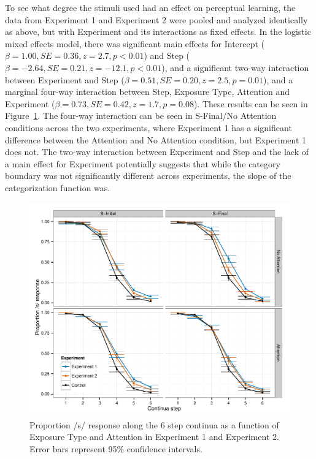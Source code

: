 \documentclass[11pt]{article}\usepackage[]{graphicx}\usepackage[]{color}
\begin{document}
To see what degree the stimuli used had an effect on perceptual learning, the data from Experiment 1 and Experiment 2 were pooled and analyzed identically as above, but with Experiment and its interactions as fixed effects.  In the logistic mixed effects model, there was significant main effects for Intercept ($\beta = 1.00, SE = 0.36, z = 2.7, p < 0.01$) and Step ($\beta = -2.64, SE = 0.21, z = -12.1, p < 0.01$), and a significant two-way interaction between Experiment and Step ($\beta = 0.51, SE = 0.20, z = 2.5, p = 0.01$), and a marginal four-way interaction between Step, Exposure Type, Attention and Experiment ($\beta = 0.73, SE = 0.42, z = 1.7, p = 0.08$).  These results can be seen in Figure~\ref{fig:exp12categ}.  The four-way interaction can be seen in S-Final/No Attention conditions across the two experiments, where Experiment 1 has a significant difference between the Attention and No Attention condition, but Experiment 1 does not.  The two-way interaction between Experiment and Step and the lack of a main effect for Experiment potentially suggests that while the category boundary was not significantly different across experiments, the slope of the categorization function was.

\begin{figure}[!ht]
\caption{Proportion /s/ response along the 6 step continua as a function of Exposure Type and Attention in Experiment 1 and Experiment 2. Error bars represent 95\% confidence intervals.}
\label{fig:exp12categ}
\begin{center}
\includegraphics[width=\textwidth]{graphs/exp12_categresults}
\end{center}
\end{figure}
\end{document}
